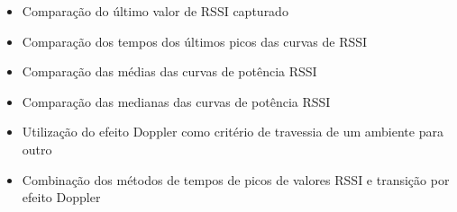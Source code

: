\begin{itemize}
    \item Comparação do último valor de RSSI capturado
    \item Comparação dos tempos dos últimos picos das curvas de RSSI
    \item Comparação das médias das curvas de potência RSSI
    \item Comparação das medianas das curvas de potência RSSI
    \item Utilização do efeito Doppler como critério de travessia de um ambiente para outro
    \item Combinação dos métodos de tempos de picos de valores RSSI e transição por efeito Doppler
\end{itemize}